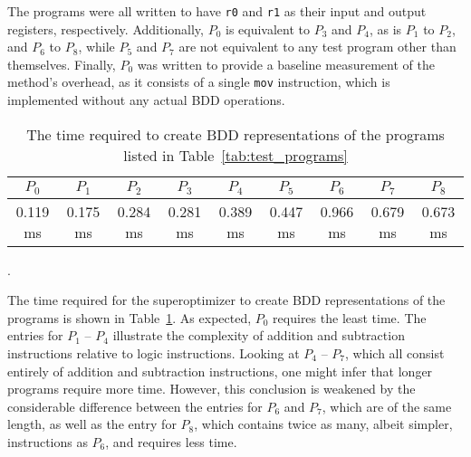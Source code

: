 \documentclass[a4paper,11pt]{kth-mag}
\begin{document}
The programs were all written to have \verb|r0| and \verb|r1| as their input and output registers, respectively.
Additionally, $P_0$ is equivalent to $P_3$ and $P_4$, as is $P_1$ to $P_2$, and $P_6$ to $P_8$, while $P_5$ and $P_7$ are not equivalent to any test program other than themselves.
Finally, $P_0$ was written to provide a baseline measurement of the method's overhead, as it consists of a single \verb|mov| instruction, which is implemented without any actual BDD operations.


\begin{table}
\centering
\tiny
\setlength{\tabcolsep}{3pt}
\begin{tabular}{*{9}{c}}
$P_0$    & $P_1$    & $P_2$    & $P_3$    & $P_4$    & $P_5$    & $P_6$    & $P_7$    & $P_8$    \\
\hline
0.119 ms & 0.175 ms & 0.284 ms & 0.281 ms & 0.389 ms & 0.447 ms & 0.966 ms & 0.679 ms & 0.673 ms \\
\end{tabular}
\caption{The time required to create BDD representations of the programs listed in Table~\ref{tab:test_programs}}.
\label{tab:performance1}
\end{table}

The time required for the superoptimizer to create BDD representations of the programs is shown in Table~\ref{tab:performance1}.
As expected, $P_0$ requires the least time.
The entries for $P_1$ -- $P_4$ illustrate the complexity of addition and subtraction instructions relative to logic instructions.
Looking at $P_4$ -- $P_7$, which all consist entirely of addition and subtraction instructions, one might infer that longer programs require more time.
However, this conclusion is weakened by the considerable difference between the entries for $P_6$ and $P_7$, which are of the same length,
as well as the entry for $P_8$, which contains twice as many, albeit simpler, instructions as $P_6$, and requires less time.
\end{document}
